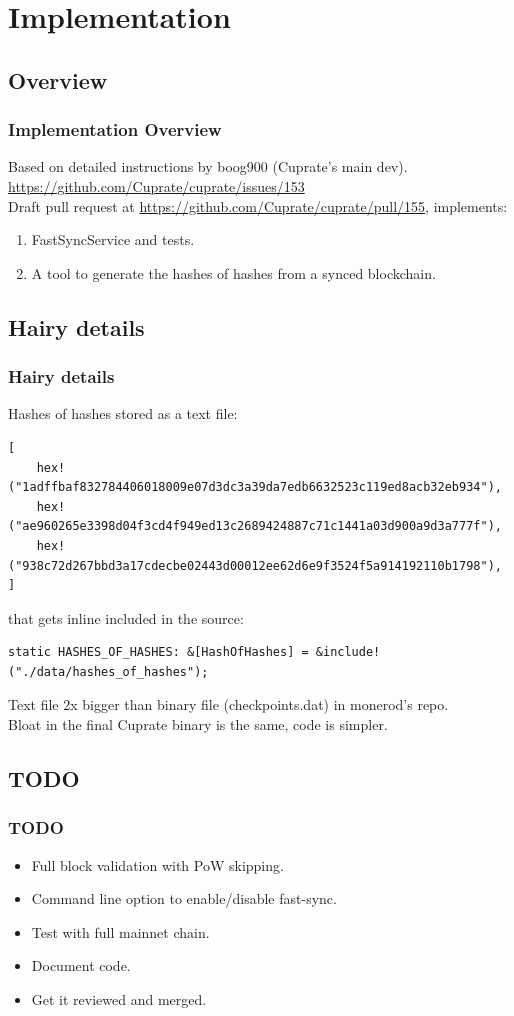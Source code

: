 \documentclass[aspectratio=169]{beamer}
\begin{document}
\section{Implementation}
\subsection{Overview}
\begin{frame}[fragile]
  \frametitle{Implementation Overview}
  Based on detailed instructions by boog900 (Cuprate's main dev).\\
  \url{https://github.com/Cuprate/cuprate/issues/153}\\
  \vspace{2\baselineskip}
  Draft pull request at \url{https://github.com/Cuprate/cuprate/pull/155}, implements:
  \begin{enumerate}
    \item FastSyncService and tests.\\
    \item A tool to generate the hashes of hashes from a synced blockchain.
  \end{enumerate}
\end{frame}

\subsection{Hairy details}
\begin{frame}[fragile]
  \frametitle{Hairy details}
  Hashes of hashes stored as a text file:
  \lstset{
    basicstyle=\tiny\ttfamily,
  }
  \begin{lstlisting}
[
	hex!("1adffbaf832784406018009e07d3dc3a39da7edb6632523c119ed8acb32eb934"),
	hex!("ae960265e3398d04f3cd4f949ed13c2689424887c71c1441a03d900a9d3a777f"),
	hex!("938c72d267bbd3a17cdecbe02443d00012ee62d6e9f3524f5a914192110b1798"),
]
  \end{lstlisting}
  that gets inline included in the source:
  \begin{lstlisting}
static HASHES_OF_HASHES: &[HashOfHashes] = &include!("./data/hashes_of_hashes");
  \end{lstlisting}
  Text file 2x bigger than binary file (checkpoints.dat) in monerod's repo.\\
  Bloat in the final Cuprate binary is the same, code is simpler.
\end{frame}

\subsection{TODO}
\begin{frame}[fragile]
  \frametitle{TODO}
  \begin{itemize}
    \item Full block validation with PoW skipping.
    \item Command line option to enable/disable fast-sync.
    \item Test with full mainnet chain.
    \item Document code.
    \item Get it reviewed and merged.
  \end{itemize}
\end{frame}
\end{document}
